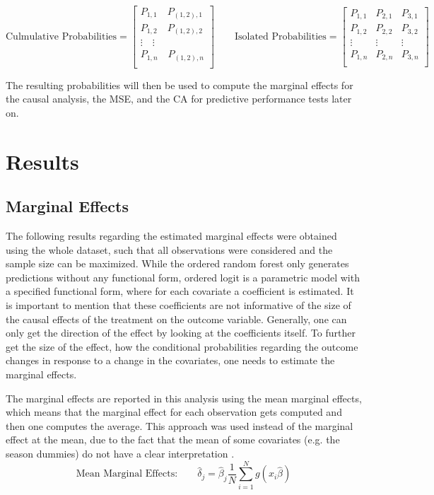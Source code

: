 \documentclass[11pt]{article}
\begin{document}
$$
\text{Culmulative Probabilities} = \begin{bmatrix}
P_{1,1}\quad P_{(1,2),1}\\
P_{1,2}\quad P_{(1,2),2}\\
\vdots\quad \vdots\\
P_{1,n}\quad P_{(1,2),n}\\
\end{bmatrix}
\qquad
\text{Isolated Probabilities} =
\begin{bmatrix}
P_{1,1} & P_{2,1} & P_{3,1}\\
P_{1,2} & P_{2,2} & P_{3,2}\\
\vdots & \vdots & \vdots\\
P_{1,n} & P_{2,n} & P_{3,n}\\
\end{bmatrix}
$$

The resulting probabilities will then be used to compute the marginal effects for the causal analysis, the MSE, and the CA for predictive performance tests later on.


\section{Results}

\subsection{Marginal Effects}

The following results regarding the estimated marginal effects were obtained using the whole dataset, such that all observations were considered and the sample size can be maximized. While the ordered random forest only generates predictions without any functional form, ordered logit is a parametric model with a specified functional form, where for each covariate a coefficient is estimated. It is important to mention that these coefficients are not informative of the size of the causal effects of the treatment on the outcome variable. Generally, one can only get the direction of the effect by looking at the coefficients itself. To further get the size of the effect, how the conditional probabilities regarding the outcome changes in response to a change in the covariates, one needs to estimate the marginal effects.

The marginal effects are reported in this analysis using the mean marginal effects, which means that the marginal effect for each observation gets computed and then one computes the average. This approach was used instead of the marginal effect at the mean, due to the fact that the mean of some covariates (e.g. the season dummies) do not have a clear interpretation \cite[p.310]{bartus2005}.
$$
\text{Mean Marginal Effects:} \qquad \hat{\delta}_j = \hat{\beta}_j \frac{1}{N} \sum^N_{i=1} g(x_i \hat{\beta})
$$
\end{document}
